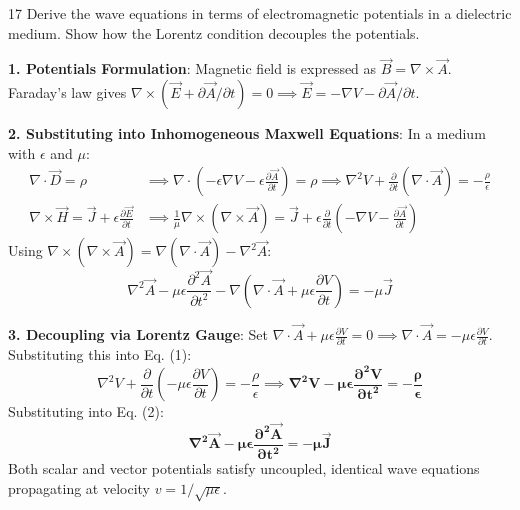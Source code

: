 \begin{theoryq}{17}
Derive the wave equations in terms of electromagnetic potentials in a dielectric medium. Show how the Lorentz condition decouples the potentials.
\end{theoryq}
\begin{theorysol}
\textbf{1. Potentials Formulation}:
Magnetic field is expressed as $\vec{B} = \nabla \times \vec{A}$.
Faraday's law gives $\nabla \times (\vec{E} + \partial\vec{A}/\partial t) = 0 \implies \vec{E} = -\nabla V - \partial\vec{A}/\partial t$.

\textbf{2. Substituting into Inhomogeneous Maxwell Equations}:
In a medium with $\epsilon$ and $\mu$:
\begin{align}
\nabla \cdot \vec{D} = \rho &\implies \nabla \cdot \left(-\epsilon\nabla V - \epsilon\frac{\partial\vec{A}}{\partial t}\right) = \rho \implies \nabla^2 V + \frac{\partial}{\partial t}(\nabla \cdot \vec{A}) = -\frac{\rho}{\epsilon} \\
\nabla \times \vec{H} = \vec{J} + \epsilon\frac{\partial\vec{E}}{\partial t} &\implies \frac{1}{\mu}\nabla \times (\nabla \times \vec{A}) = \vec{J} + \epsilon\frac{\partial}{\partial t}\left(-\nabla V - \frac{\partial\vec{A}}{\partial t}\right)
\end{align}
Using $\nabla \times (\nabla \times \vec{A}) = \nabla(\nabla \cdot \vec{A}) - \nabla^2 \vec{A}$:
\begin{equation}
\nabla^2 \vec{A} - \mu\epsilon\frac{\partial^2\vec{A}}{\partial t^2} - \nabla\left(\nabla \cdot \vec{A} + \mu\epsilon\frac{\partial V}{\partial t}\right) = -\mu\vec{J}
\end{equation}

\textbf{3. Decoupling via Lorentz Gauge}:
Set $\nabla \cdot \vec{A} + \mu\epsilon\frac{\partial V}{\partial t} = 0 \implies \nabla \cdot \vec{A} = -\mu\epsilon\frac{\partial V}{\partial t}$.
Substituting this into Eq. (1):
\begin{equation}
\nabla^2 V + \frac{\partial}{\partial t}\left(-\mu\epsilon\frac{\partial V}{\partial t}\right) = -\frac{\rho}{\epsilon} \implies \mathbf{\nabla^2 V - \mu\epsilon\frac{\partial^2 V}{\partial t^2} = -\frac{\rho}{\epsilon}}
\end{equation}
Substituting into Eq. (2):
\begin{equation}
\mathbf{\nabla^2 \vec{A} - \mu\epsilon\frac{\partial^2\vec{A}}{\partial t^2} = -\mu\vec{J}}
\end{equation}
Both scalar and vector potentials satisfy uncoupled, identical wave equations propagating at velocity $v = 1/\sqrt{\mu\epsilon}$.
\end{theorysol}
\vspace{4mm}

